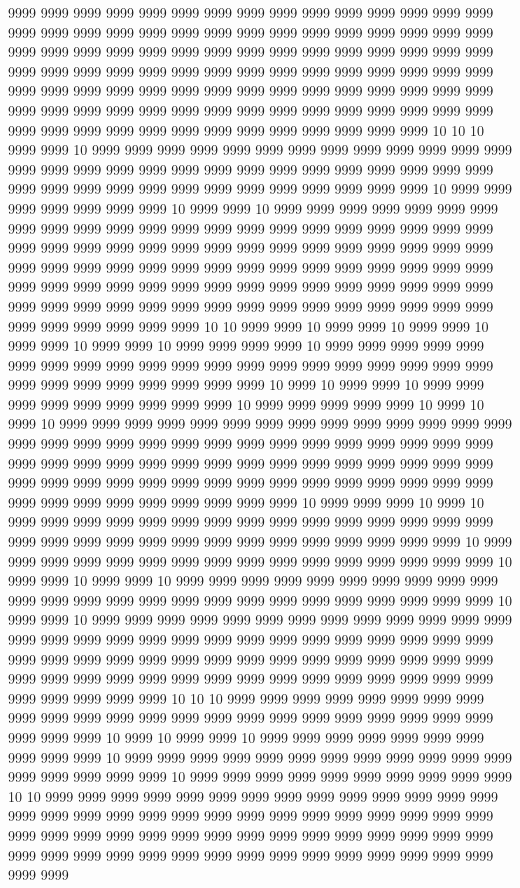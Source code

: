 9999 9999 9999 9999 9999 9999 9999 9999 9999 9999 9999 9999 9999 9999 9999 9999 9999 9999 9999 9999 9999 9999 9999 9999 9999 9999 9999 9999 9999 9999 9999 9999 9999 9999 9999 9999 9999 9999 9999 9999 9999 9999 9999 9999 9999 9999 9999 9999 9999 9999 9999 9999 9999 9999 9999 9999 9999 9999 9999 9999 9999 9999 9999 9999 9999 9999 9999 9999 9999 9999 9999 9999 9999 9999 9999 9999 9999 9999 9999 9999 9999 9999 9999 9999 9999 9999 9999 9999 9999 9999 9999 9999 9999 9999 9999 9999 9999 9999 9999 9999 9999 9999 9999 10 10 10 9999 9999 10 9999 9999 9999 9999 9999 9999 9999 9999 9999 9999 9999 9999 9999 9999 9999 9999 9999 9999 9999 9999 9999 9999 9999 9999 9999 9999 9999 9999 9999 9999 9999 9999 9999 9999 9999 9999 9999 9999 9999 9999 9999 10 9999 9999 9999 9999 9999 9999 9999 10 9999 9999 10 9999 9999 9999 9999 9999 9999 9999 9999 9999 9999 9999 9999 9999 9999 9999 9999 9999 9999 9999 9999 9999 9999 9999 9999 9999 9999 9999 9999 9999 9999 9999 9999 9999 9999 9999 9999 9999 9999 9999 9999 9999 9999 9999 9999 9999 9999 9999 9999 9999 9999 9999 9999 9999 9999 9999 9999 9999 9999 9999 9999 9999 9999 9999 9999 9999 9999 9999 9999 9999 9999 9999 9999 9999 9999 9999 9999 9999 9999 9999 9999 9999 9999 9999 9999 9999 9999 9999 9999 10 10 9999 9999 10 9999 9999 10 9999 9999 10 9999 9999 10 9999 9999 10 9999 9999 9999 9999 10 9999 9999 9999 9999 9999 9999 9999 9999 9999 9999 9999 9999 9999 9999 9999 9999 9999 9999 9999 9999 9999 9999 9999 9999 9999 9999 9999 9999 10 9999 10 9999 9999 10 9999 9999 9999 9999 9999 9999 9999 9999 9999 10 9999 9999 9999 9999 9999 10 9999 10 9999 10 9999 9999 9999 9999 9999 9999 9999 9999 9999 9999 9999 9999 9999 9999 9999 9999 9999 9999 9999 9999 9999 9999 9999 9999 9999 9999 9999 9999 9999 9999 9999 9999 9999 9999 9999 9999 9999 9999 9999 9999 9999 9999 9999 9999 9999 9999 9999 9999 9999 9999 9999 9999 9999 9999 9999 9999 9999 9999 9999 9999 9999 9999 9999 9999 9999 9999 9999 9999 10 9999 9999 9999 10 9999 10 9999 9999 9999 9999 9999 9999 9999 9999 9999 9999 9999 9999 9999 9999 9999 9999 9999 9999 9999 9999 9999 9999 9999 9999 9999 9999 9999 9999 9999 10 9999 9999 9999 9999 9999 9999 9999 9999 9999 9999 9999 9999 9999 9999 9999 9999 10 9999 9999 10 9999 9999 10 9999 9999 9999 9999 9999 9999 9999 9999 9999 9999 9999 9999 9999 9999 9999 9999 9999 9999 9999 9999 9999 9999 9999 9999 9999 10 9999 9999 10 9999 9999 9999 9999 9999 9999 9999 9999 9999 9999 9999 9999 9999 9999 9999 9999 9999 9999 9999 9999 9999 9999 9999 9999 9999 9999 9999 9999 9999 9999 9999 9999 9999 9999 9999 9999 9999 9999 9999 9999 9999 9999 9999 9999 9999 9999 9999 9999 9999 9999 9999 9999 9999 9999 9999 9999 9999 9999 9999 9999 9999 9999 9999 10 10 10 9999 9999 9999 9999 9999 9999 9999 9999 9999 9999 9999 9999 9999 9999 9999 9999 9999 9999 9999 9999 9999 9999 9999 9999 9999 9999 10 9999 10 9999 9999 10 9999 9999 9999 9999 9999 9999 9999 9999 9999 9999 10 9999 9999 9999 9999 9999 9999 9999 9999 9999 9999 9999 9999 9999 9999 9999 9999 9999 10 9999 9999 9999 9999 9999 9999 9999 9999 9999 9999 10 10 9999 9999 9999 9999 9999 9999 9999 9999 9999 9999 9999 9999 9999 9999 9999 9999 9999 9999 9999 9999 9999 9999 9999 9999 9999 9999 9999 9999 9999 9999 9999 9999 9999 9999 9999 9999 9999 9999 9999 9999 9999 9999 9999 9999 9999 9999 9999 9999 9999 9999 9999 9999 9999 9999 9999 9999 9999 9999 9999 9999 9999 